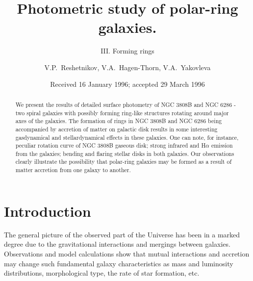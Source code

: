 



\title{ Photometric study of polar-ring galaxies.}

\subtitle{ III. Forming rings}

\author{V.P.~Reshetnikov, V.A.~Hagen-Thorn, 
V.A.~Yakovleva }



\date{Received 16 January 1996; accepted 29 March 1996}

\maketitle

\begin{abstract}
We present the results of detailed surface photometry of NGC 3808B and
NGC 6286 - two spiral galaxies with possibly forming ring-like
structures rotating around major axes of the galaxies. 
The formation of rings in NGC 3808B and NGC 6286 being accompanied by 
accretion
of matter on galactic disk results in some interesting
gasdynamical and stellardynamical effects in these galaxies.
One can note, for instance, peculiar rotation curve of NGC 3808B
gaseous disk; strong infrared and H$\alpha$ emission from the galaxies;
bending and flaring stellar disks in both galaxies. Our observations
clearly illustrate the possibility that polar-ring galaxies may be
formed as a result of matter accretion from one galaxy to another.


\end{abstract}


\section{Introduction}

The general picture of the observed part of the Universe has been
in a marked degree due to the gravitational interactions and
mergings between galaxies. Observations and model calculations
show that mutual interactions and accretion may change such
fundamental galaxy characteristics as mass and luminosity
distributions, morphological type, the rate of star formation, etc.

